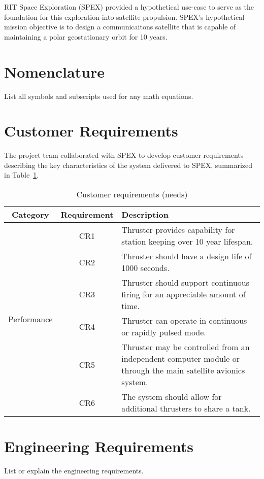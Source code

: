 \documentclass[journal]{IEEEtran}
\begin{document}
RIT Space Exploration (SPEX) provided a hypothetical use-case to serve as the foundation for this exploration into satellite propulsion.
SPEX's hypothetical mission objective is to design a communicaitons satellite that is capable of maintaining a polar geostationary orbit for 10 years.

\section{Nomenclature}
\label{sec:nomenclature}
List all symbols and subscripts used for any math equations.

\section{Customer Requirements}
\label{sec:creqs}
The project team collaborated with SPEX to develop customer requirements describing the key characteristics of the system delivered to SPEX, summarized in Table~\ref{tab:creqs-table}.
\begin{table}
  \caption{Customer requirements (needs)}
\label{tab:creqs-table}
  \begin{tabular}{c c p{1.9in}}
    \hline
    \textbf{Category} & \textbf{Requirement} & \textbf{Description} \\
    \hline
    \multirow{7}{*}{Performance} & CR1 & Thruster provides capability for station keeping over 10 year lifespan. \\
    & CR2 & Thruster should have a design life of 1000 seconds. \\
    & CR3 & Thruster should support continuous firing for an appreciable amount of time. \\
    & CR4 & Thruster can operate in continuous or rapidly pulsed mode. \\
    \hline
    \multirow{5}{*}{Integration} & CR5 & Thruster may be controlled from an independent computer module or through the main satellite avionics system. \\
    & CR6 & The system should allow for additional thrusters to share a tank. \\
    \hline
  \end{tabular}
\end{table}

\section{Engineering Requirements}
\label{sec:ereqs}
List or explain the engineering requirements.
\end{document}

